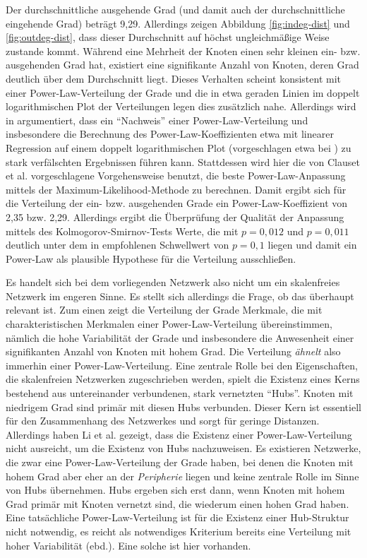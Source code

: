 Der durchschnittliche ausgehende Grad (und damit auch der
durchschnittliche eingehende Grad) beträgt 9,29. Allerdings zeigen
Abbildung \ref{fig:indeg-dist} und \ref{fig:outdeg-dist}, dass dieser
Durchschnitt auf höchst ungleichmäßige Weise zustande kommt. Während
eine Mehrheit der Knoten einen sehr kleinen ein- bzw. ausgehenden Grad
hat, existiert eine signifikante Anzahl von Knoten, deren Grad
deutlich über dem Durchschnitt liegt. Dieses Verhalten scheint konsistent
mit einer Power-Law-Verteilung der Grade und die in etwa geraden
Linien im doppelt logarithmischen Plot der Verteilungen legen dies
zusätzlich nahe. Allerdings wird in \cite{Clauset2009} argumentiert,
dass ein ``Nachweis'' einer Power-Law-Verteilung und insbesondere die
Berechnung des Power-Law-Koeffizienten etwa mit linearer Regression
auf einem doppelt logarithmischen Plot (vorgeschlagen etwa bei
\cite{Brinkmeier2004}) zu stark verfälschten Ergebnissen führen
kann. Stattdessen wird hier die von Clauset et al. vorgeschlagene
Vorgehensweise benutzt, die beste Power-Law-Anpassung mittels der
Maximum-Likelihood-Methode zu berechnen. Damit ergibt sich für die
Verteilung der ein- bzw. ausgehenden Grade ein Power-Law-Koeffizient
von 2,35 bzw. 2,29. Allerdings ergibt die Überprüfung der Qualität der
Anpassung mittels des Kolmogorov-Smirnov-Tests Werte, die mit $p =
0,012$ und $p = 0,011$ deutlich unter dem in \cite{Clauset2009}
empfohlenen Schwellwert von $p=0,1$ liegen und damit ein Power-Law als
plausible Hypothese für die Verteilung ausschließen.


Es handelt sich bei dem vorliegenden Netzwerk also nicht um ein
skalenfreies Netzwerk im engeren Sinne. Es stellt sich allerdings die
Frage, ob das überhaupt relevant ist. Zum einen zeigt die Verteilung
der Grade Merkmale, die mit charakteristischen Merkmalen einer
Power-Law-Verteilung übereinstimmen, nämlich die hohe
Variabilität der Grade und insbesondere die Anwesenheit einer
signifikanten Anzahl von Knoten mit hohem Grad. Die Verteilung
\emph{ähnelt} also immerhin einer Power-Law-Verteilung. Eine
zentrale Rolle bei den Eigenschaften, die skalenfreien Netzwerken
zugeschrieben werden, spielt die Existenz eines Kerns bestehend aus
untereinander verbundenen, stark vernetzten ``Hubs''. Knoten mit niedrigem Grad sind primär mit diesen Hubs
verbunden. Dieser Kern ist essentiell  f\"ur den Zusammenhang des
Netzwerkes und sorgt für
geringe Distanzen. Allerdings haben Li et al. \cite{Li2005} gezeigt,
dass die Existenz einer Power-Law-Verteilung nicht ausreicht, um die
Existenz von Hubs nachzuweisen. Es existieren Netzwerke, die zwar eine
Power-Law-Verteilung der Grade haben, bei denen die Knoten mit hohem
Grad aber eher an der \emph{Peripherie} liegen und keine zentrale
Rolle im Sinne von Hubs übernehmen.  Hubs ergeben sich erst dann,
wenn Knoten mit hohem Grad primär mit Knoten vernetzt sind, die
wiederum einen hohen Grad haben. Eine tatsächliche
Power-Law-Verteilung ist für die Existenz einer Hub-Struktur nicht
notwendig, es reicht als notwendiges Kriterium bereits eine Verteilung
mit hoher Variabilität (ebd.). Eine solche ist hier vorhanden.

